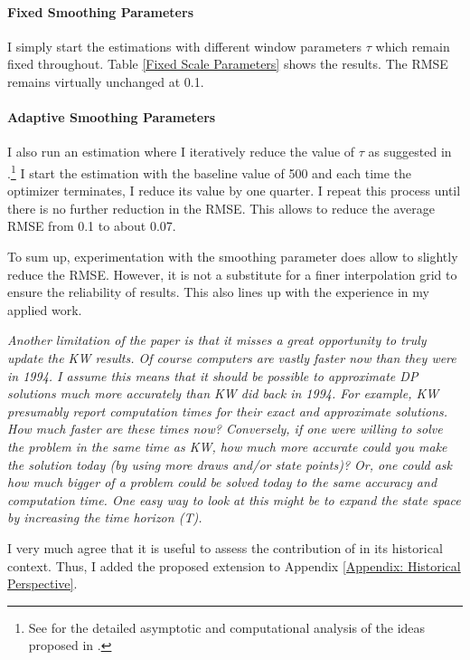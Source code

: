 \begin{boenumerate}
\paragraph{Fixed Smoothing Parameters} I simply start the estimations with different window parameters $\tau$ which remain fixed throughout. Table \ref{Fixed Scale Parameters} shows the results. The RMSE remains virtually unchanged at 0.1.



\paragraph{Adaptive Smoothing Parameters} I also run an estimation where I iteratively reduce the value of $\tau$ as suggested in \citet{Keane.2003}.\footnote{See \citet{Bruins.2015} for the detailed asymptotic and computational analysis of the ideas proposed in \citet{Keane.2003}.} I start the estimation with the baseline value of 500 and each time the optimizer terminates, I reduce its value by one quarter. I repeat this process until there is no further reduction in the RMSE. This allows to reduce the average RMSE from 0.1 to about 0.07.\newline

To sum up, experimentation with the smoothing parameter does allow to slightly reduce the RMSE. However, it is not a substitute for a finer interpolation grid to ensure the reliability of results. This also lines up with the experience in my applied work.\newline
\item \textit{Another limitation of the paper is that it misses a great opportunity to truly update the KW results. Of course computers are vastly faster now than they were in 1994. I assume this means that it should be possible to approximate DP solutions much more accurately than KW did back in 1994. For example, KW presumably report computation times for their exact and approximate solutions. How much faster are these times now? Conversely, if one were willing to solve the problem in the same time as KW, how much more accurate could you make the solution today (by using more draws and/or state points)? Or, one could ask how much bigger of a problem could be solved today to the same accuracy and computation time. One easy way to look at this might be to expand the state space by increasing the time horizon (T).}\vspace{0.5cm}

I very much agree that it is useful to assess the contribution of \citet{Keane.1994} in its historical context. Thus, I added the proposed extension to Appendix \ref{Appendix: Historical Perspective}.
\end{boenumerate}
